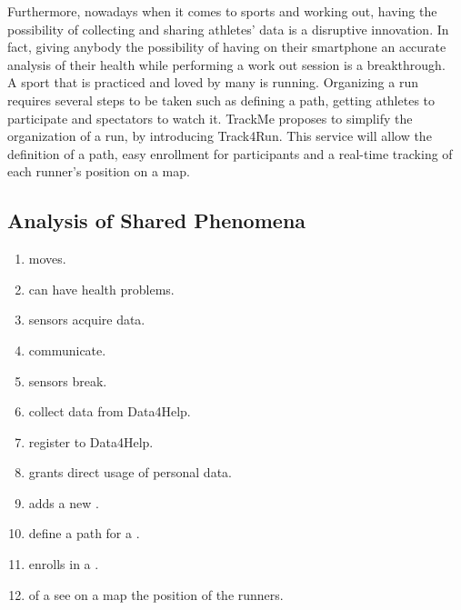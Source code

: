 \documentclass[../../rasd.tex]{subfiles}
\begin{document}
Furthermore, nowadays when it comes to sports and working out, having the possibility of collecting and sharing athletes' data is a disruptive innovation. In fact, giving anybody the possibility of having on their smartphone an accurate analysis of their health while performing a work out session is a breakthrough.\\
A sport that is practiced and loved by many is running. Organizing a run requires several steps to be taken such as defining a path, getting athletes to participate and spectators to watch it. TrackMe proposes to simplify the organization of a run, by introducing Track4Run. This service will allow the definition of a path, easy enrollment for participants and a real-time tracking of each runner’s position on a map.


\subsection{Analysis of Shared Phenomena}


\begin{enumerate}
	\item {} moves.
	\item {} can have health problems.
	\item {} sensors acquire data.
	\item {} communicate.
	\item {} sensors break.
	\item {} collect data from Data4Help.
	\item {} register to Data4Help.
	\item {} grants direct usage of personal data.
	\item {} adds a new .
	\item {} define a path for a .
	\item {} enrolls in a .
	\item {} of a  see on a map the position of the runners.
\end{enumerate}
\end{document}
